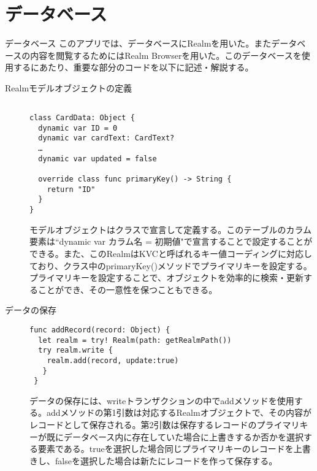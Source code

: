 \section{データベース}
データベース
このアプリでは、データベースにRealmを用いた。またデータベースの内容を閲覧するためにはRealm Browserを用いた。このデータベースを使用するにあたり、重要な部分のコードを以下に記述・解説する。
 
\begin{description}
\item[Realmモデルオブジェクトの定義]\mbox{} 
\begin{lstlisting}[basicstyle=\ttfamily\footnotesize, frame=single]
 
class CardData: Object {   
  dynamic var ID = 0
  dynamic var cardText: CardText?
  …
  dynamic var updated = false

  override class func primaryKey() -> String {
    return "ID"
  }
}
 \end{lstlisting}
 
モデルオブジェクトはクラスで宣言して定義する。このテーブルのカラム要素は``dynamic var カラム名 = 初期値"で宣言することで設定することができる。また、このRealmはKVCと呼ばれるキー値コーディングに対応しており、クラス中のprimaryKey()メソッドでプライマリキーを設定する。プライマリキーを設定することで、オブジェクトを効率的に検索・更新することができ、その一意性を保つこともできる。
\end{description}
 
\begin{description}
\item[データの保存]\mbox{} 
\begin{lstlisting}[basicstyle=\ttfamily\footnotesize, frame=single]
func addRecord(record: Object) {
  let realm = try! Realm(path: getRealmPath())
  try realm.write {
    realm.add(record, update:true)
   }
 }
\end{lstlisting}
 
データの保存には、writeトランザクションの中でaddメソッドを使用する。addメソッドの第1引数は対応するRealmオブジェクトで、その内容がレコードとして保存される。第2引数は保存するレコードのプライマリキーが既にデータベース内に存在していた場合に上書きするか否かを選択する要素である。trueを選択した場合同じプライマリキーのレコードを上書きし、falseを選択した場合は新たにレコードを作って保存する。
\end{description}
 
